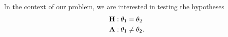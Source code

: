 \documentclass[AMA,Times1COL]{WileyNJDv5} %
\begin{document}



In the context of our problem, we are interested in testing the hypotheses
\begin{align*}
\text{\textbf{H}}&: \theta_1=\theta_2\\
\text{\textbf{A}}&: \theta_1 \neq \theta_2.
\end{align*}
\end{document}
